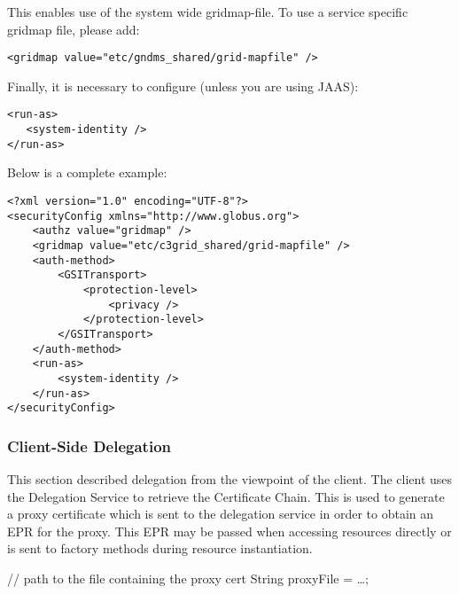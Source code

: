 \documentclass{article}
\begin{document}
This enables use of the system wide gridmap-file. To use a service
specific gridmap file, please add:


\begin{verbatim}
<gridmap value="etc/gndms_shared/grid-mapfile" />
\end{verbatim}

Finally, it is necessary to configure (unless you are using JAAS):

\begin{verbatim}
<run-as>
   <system-identity />
</run-as>
\end{verbatim}

Below is a complete example:

\begin{verbatim}
<?xml version="1.0" encoding="UTF-8"?>
<securityConfig xmlns="http://www.globus.org">
    <authz value="gridmap" />
    <gridmap value="etc/c3grid_shared/grid-mapfile" />
    <auth-method>
        <GSITransport>
            <protection-level>
                <privacy />
            </protection-level>
        </GSITransport>
    </auth-method>
    <run-as>
        <system-identity />
    </run-as>
</securityConfig>      
\end{verbatim}

\subsubsection{Client-Side Delegation}

This section described delegation from the viewpoint of the client.
The client uses the Delegation Service to retrieve the Certificate
Chain. This is used to generate a proxy certificate which is sent
to the delegation service in order to obtain an EPR for the proxy.
This EPR may be passed when accessing resources directly or is sent
to factory methods during resource instantiation.


// path to the file containing the proxy cert String proxyFile =
\ldots{};
\end{document}
